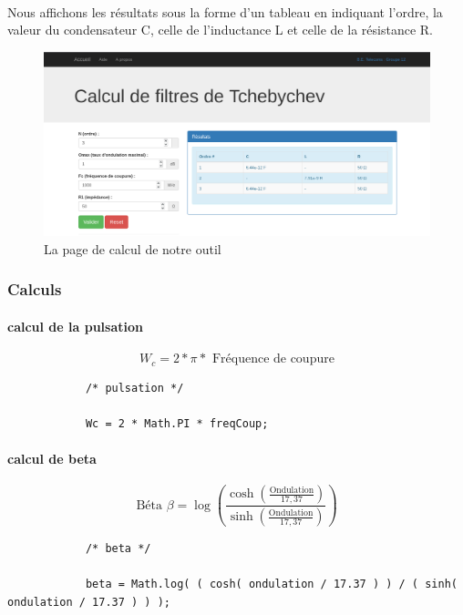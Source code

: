 \documentclass[a4paper,11pt]{article}
\begin{document}
        \paragraph{}
Nous affichons les résultats sous la forme d’un tableau en indiquant l’ordre, la valeur du condensateur C, celle de l’inductance L et celle de la résistance R.
    \\
    \begin{figure}[h]
        \begin{center}
            \includegraphics[scale=0.3]{images/filtres/screen-site.png}
        \end{center}
            \caption{ La page de calcul de notre outil }
            \label{La page de calcul de notre outil de calcul de filtres de Tchebyscheff}
    \end{figure}

    \clearpage

    \subsubsection{Calculs}

        \paragraph{calcul de la pulsation}
        \[ W_{c} = 2 * \pi * \mbox{ Fréquence de coupure}\]
        \begin{lstlisting}
            /* pulsation */

            Wc = 2 * Math.PI * freqCoup;

        \end{lstlisting}

        \paragraph{calcul de beta}
        \[ \mbox{Béta } \beta = \log( \frac{ \cosh( \frac{ \mbox{Ondulation} }{17,37} ) } { \sinh( \frac{ \mbox{Ondulation} }{17,37} ) } )\]
        \begin{lstlisting}
            /* beta */

            beta = Math.log( ( cosh( ondulation / 17.37 ) ) / ( sinh( ondulation / 17.37 ) ) );

        \end{lstlisting}
\end{document}
